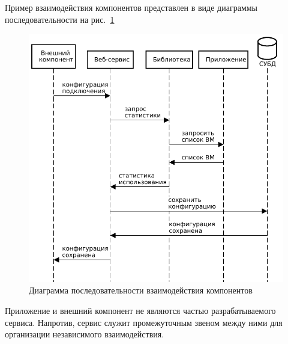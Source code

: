 Пример взаимодействия компонентов представлен в виде диаграммы последовательности на рис.~\ref{architecture-sequence}
\begin{figure}[hbtp]
    \centering
    \includegraphics[width=\textwidth]{img/architecture-sequence.pdf}
    \caption{Диаграмма последовательности взаимодействия компонентов}
    \label{architecture-sequence}
\end{figure}

Приложение и внешний компонент не являются частью разрабатываемого сервиса.
Напротив, сервис служит промежуточным звеном между ними для организации независимого взаимодействия.

\FloatBarrier